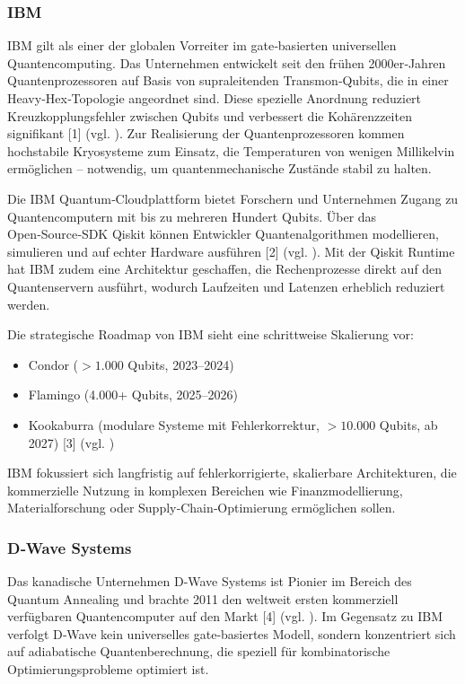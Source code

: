 \subsubsection*{IBM}
IBM gilt als einer der globalen Vorreiter im gate‑basierten universellen Quantencomputing.
Das Unternehmen entwickelt seit den frühen 2000er‑Jahren Quantenprozessoren auf Basis von supraleitenden Transmon‑Qubits, die in einer Heavy‑Hex‑Topologie angeordnet sind.
Diese spezielle Anordnung reduziert Kreuzkopplungsfehler zwischen Qubits und verbessert die Kohärenzzeiten signifikant [1] (vgl. \cite{brandhofer_benchmarking_2022}).
Zur Realisierung der Quantenprozessoren kommen hochstabile Kryosysteme zum Einsatz, die Temperaturen von wenigen Millikelvin ermöglichen – notwendig, um quantenmechanische Zustände stabil zu halten.

Die IBM Quantum‑Cloudplattform bietet Forschern und Unternehmen Zugang zu Quantencomputern mit bis zu mehreren Hundert Qubits.
Über das Open‑Source‑SDK Qiskit können Entwickler Quantenalgorithmen modellieren, simulieren und auf echter Hardware ausführen [2] (vgl. \cite{brandhofer_benchmarking_20220}).
Mit der Qiskit Runtime hat IBM zudem eine Architektur geschaffen, die Rechenprozesse direkt auf den Quantenservern ausführt, wodurch Laufzeiten und Latenzen erheblich reduziert werden.

Die strategische Roadmap von IBM sieht eine schrittweise Skalierung vor:
\begin{itemize}
\item Condor ($>1.000$ Qubits, 2023–2024)
\item Flamingo (4.000+ Qubits, 2025–2026)
\item Kookaburra (modulare Systeme mit Fehlerkorrektur, $>10.000$ Qubits, ab 2027) [3] (vgl. \cite{brandhofer_benchmarking_2022})
\end{itemize}
IBM fokussiert sich langfristig auf fehlerkorrigierte, skalierbare Architekturen, die kommerzielle Nutzung in komplexen Bereichen wie Finanzmodellierung, Materialforschung oder Supply‑Chain‑Optimierung ermöglichen sollen.

\subsubsection*{D‑Wave Systems}
Das kanadische Unternehmen D‑Wave Systems ist Pionier im Bereich des Quantum Annealing und brachte 2011 den weltweit ersten kommerziell verfügbaren Quantencomputer auf den Markt [4] (vgl. \cite{brandhofer_benchmarking_2022}).
Im Gegensatz zu IBM verfolgt D‑Wave kein universelles gate‑basiertes Modell, sondern konzentriert sich auf adiabatische Quantenberechnung, die speziell für kombinatorische Optimierungsprobleme optimiert ist.

